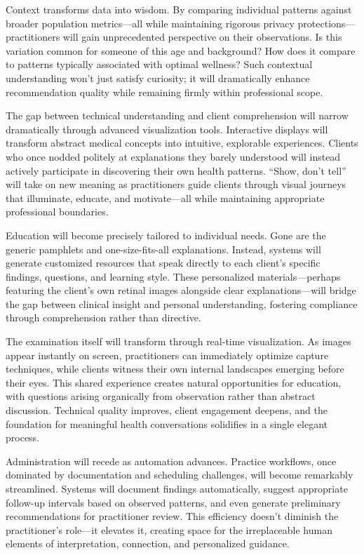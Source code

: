 \documentclass[
  Letterpaper,
]{scrbook}
\begin{document}
Context transforms data into wisdom. By comparing individual patterns
against broader population metrics---all while maintaining rigorous
privacy protections---practitioners will gain unprecedented perspective
on their observations. Is this variation common for someone of this age
and background? How does it compare to patterns typically associated
with optimal wellness? Such contextual understanding won't just satisfy
curiosity; it will dramatically enhance recommendation quality while
remaining firmly within professional scope.

The gap between technical understanding and client comprehension will
narrow dramatically through advanced visualization tools. Interactive
displays will transform abstract medical concepts into intuitive,
explorable experiences. Clients who once nodded politely at explanations
they barely understood will instead actively participate in discovering
their own health patterns. ``Show, don't tell'' will take on new meaning
as practitioners guide clients through visual journeys that illuminate,
educate, and motivate---all while maintaining appropriate professional
boundaries.

Education will become precisely tailored to individual needs. Gone are
the generic pamphlets and one-size-fits-all explanations. Instead,
systems will generate customized resources that speak directly to each
client's specific findings, questions, and learning style. These
personalized materials---perhaps featuring the client's own retinal
images alongside clear explanations---will bridge the gap between
clinical insight and personal understanding, fostering compliance
through comprehension rather than directive.

The examination itself will transform through real-time visualization.
As images appear instantly on screen, practitioners can immediately
optimize capture techniques, while clients witness their own internal
landscapes emerging before their eyes. This shared experience creates
natural opportunities for education, with questions arising organically
from observation rather than abstract discussion. Technical quality
improves, client engagement deepens, and the foundation for meaningful
health conversations solidifies in a single elegant process.

Administration will recede as automation advances. Practice workflows,
once dominated by documentation and scheduling challenges, will become
remarkably streamlined. Systems will document findings automatically,
suggest appropriate follow-up intervals based on observed patterns, and
even generate preliminary recommendations for practitioner review. This
efficiency doesn't diminish the practitioner's role---it elevates it,
creating space for the irreplaceable human elements of interpretation,
connection, and personalized guidance.
\end{document}
